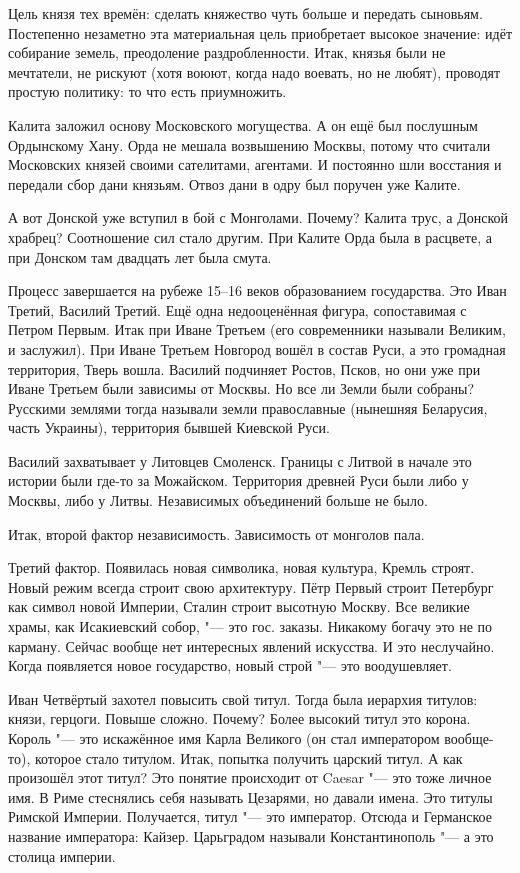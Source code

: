 Цель князя тех времён: сделать княжество чуть больше и передать сыновьям. Постепенно незаметно эта материальная цель приобретает высокое значение: идёт собирание земель, преодоление раздробленности. Итак, князья были не мечтатели, не рискуют (хотя воюют, когда надо воевать, но не любят), проводят простую политику: то что есть приумножить.

Калита заложил основу Московского могущества. А он ещё был послушным Ордынскому Хану. Орда не мешала возвышению Москвы, потому что считали Московских князей своими сателитами, агентами. И постоянно шли восстания и передали сбор дани князьям. Отвоз дани в одру был поручен уже Калите.

А вот Донской уже вступил в бой с Монголами. Почему? Калита трус, а Донской храбрец? Соотношение сил стало другим. При Калите Орда была в расцвете, а при Донском там двадцать лет была смута.

Процесс завершается на рубеже 15--16 веков образованием государства. Это Иван Третий, Василий Третий. Ещё одна недооценённая фигура, сопоставимая с Петром Первым. Итак при Иване Третьем (его современники называли Великим, и заслужил). При Иване Третьем Новгород вошёл в состав Руси, а это громадная территория, Тверь вошла. Василий подчиняет Ростов, Псков, но они уже при Иване Третьем были зависимы от Москвы. Но все ли Земли были собраны? Русскими землями тогда называли земли православные (нынешняя Беларусия, часть Украины), территория бывшей Киевской Руси.

Василий захватывает у Литовцев Смоленск. Границы с Литвой в начале это истории были где-то за Можайском. Территория древней Руси были либо у Москвы, либо у Литвы. Независимых объединений больше не было.

Итак, второй фактор независимость. Зависимость от монголов пала.

Третий фактор. Появилась новая символика, новая культура, Кремль строят. Новый режим всегда строит свою архитектуру. Пётр Первый строит Петербург как символ новой Империи, Сталин строит высотную Москву. Все великие храмы, как Исакиевский собор, "--- это гос. заказы. Никакому богачу это не по карману. Сейчас вообще нет интересных явлений искусства. И это неслучайно. Когда появляется новое государство, новый строй "--- это воодушевляет.

Иван Четвёртый захотел повысить свой титул. Тогда была иерархия титулов: князи, герцоги. Повыше сложно. Почему? Более высокий титул это корона. Король "--- это искажённое имя Карла Великого (он стал императором вообще-то), которое стало титулом. Итак, попытка получить царский титул. А как произошёл этот титул? Это понятие происходит от Caesar "--- это тоже личное имя. В Риме стеснялись себя называть Цезарями, но давали имена. Это титулы Римской Империи. Получается, титул "--- это император. Отсюда и Германское название императора: Кайзер. Царьградом называли Константинополь "--- а это столица империи.

